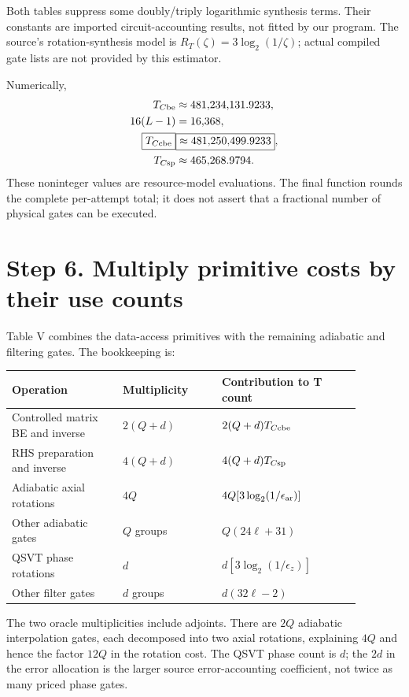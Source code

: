 \documentclass[11pt]{article}
\begin{document}
Both tables suppress some doubly/triply logarithmic synthesis terms. Their constants are imported circuit-accounting results, not fitted by our program. The source's rotation-synthesis model is $R_T(\zeta)=3\log_2(1/\zeta)$; actual compiled gate lists are not provided by this estimator.

Numerically,
\begin{align*}
 T_{C\rm be}&\approx481{,}234{,}131.9233,\\
 16(L-1)&=16{,}368,\\
 \boxed{T_{C\rm cbe}}&\boxed{\approx481{,}250{,}499.9233},\\
 T_{C\rm sp}&\approx465{,}268.9794.
\end{align*}
These noninteger values are resource-model evaluations. The final function rounds the complete per-attempt total; it does not assert that a fractional number of physical gates can be executed.

\newpage
\section*{Step 6. Multiply primitive costs by their use counts}
Table V combines the data-access primitives with the remaining adiabatic and filtering gates. The bookkeeping is:
\begin{center}\small
\begin{tabular}{p{0.28\linewidth}p{0.25\linewidth}p{0.35\linewidth}}
\toprule
Operation & Multiplicity & Contribution to T count\\\midrule
Controlled matrix BE and inverse & $2(Q+d)$ & $2(Q+d)T_{C\rm cbe}$\\
RHS preparation and inverse & $4(Q+d)$ & $4(Q+d)T_{C\rm sp}$\\
Adiabatic axial rotations & $4Q$ & $4Q[3\log_2(1/\epsilon_{\rm ar})]$\\
Other adiabatic gates & $Q$ groups & $Q(24\ell+31)$\\
QSVT phase rotations & $d$ & $d[3\log_2(1/\epsilon_z)]$\\
Other filter gates & $d$ groups & $d(32\ell-2)$\\\bottomrule
\end{tabular}
\end{center}
The two oracle multiplicities include adjoints. There are $2Q$ adiabatic interpolation gates, each decomposed into two axial rotations, explaining $4Q$ and hence the factor $12Q$ in the rotation cost. The QSVT phase count is $d$; the $2d$ in the error allocation is the larger source error-accounting coefficient, not twice as many priced phase gates.
\end{document}
